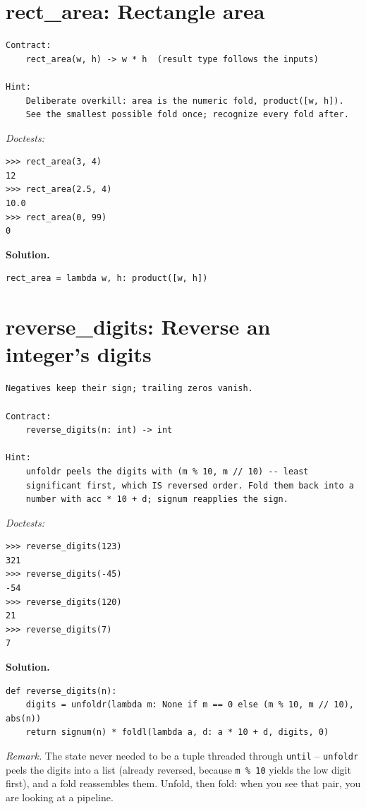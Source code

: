 \documentclass[11pt,letterpaper]{book}
\begin{document}
\section{rect\_area: Rectangle area}
\begin{lstlisting}[style=spec]
Contract:
    rect_area(w, h) -> w * h  (result type follows the inputs)

Hint:
    Deliberate overkill: area is the numeric fold, product([w, h]).
    See the smallest possible fold once; recognize every fold after.
\end{lstlisting}
\noindent\textit{Doctests:}
\begin{lstlisting}[style=spec]
>>> rect_area(3, 4)
12
>>> rect_area(2.5, 4)
10.0
>>> rect_area(0, 99)
0
\end{lstlisting}
\noindent\textbf{Solution.}
\begin{lstlisting}[style=code]
rect_area = lambda w, h: product([w, h])
\end{lstlisting}

\section{reverse\_digits: Reverse an integer's digits}
\begin{lstlisting}[style=spec]
Negatives keep their sign; trailing zeros vanish.

Contract:
    reverse_digits(n: int) -> int

Hint:
    unfoldr peels the digits with (m % 10, m // 10) -- least
    significant first, which IS reversed order. Fold them back into a
    number with acc * 10 + d; signum reapplies the sign.
\end{lstlisting}
\noindent\textit{Doctests:}
\begin{lstlisting}[style=spec]
>>> reverse_digits(123)
321
>>> reverse_digits(-45)
-54
>>> reverse_digits(120)
21
>>> reverse_digits(7)
7
\end{lstlisting}
\noindent\textbf{Solution.}
\begin{lstlisting}[style=code]
def reverse_digits(n):
    digits = unfoldr(lambda m: None if m == 0 else (m % 10, m // 10), abs(n))
    return signum(n) * foldl(lambda a, d: a * 10 + d, digits, 0)
\end{lstlisting}

\noindent\textit{Remark.} The state never needed to be a tuple threaded through
\texttt{until} -- \texttt{unfoldr} peels the digits into a list (already reversed,
because \texttt{m \% 10} yields the low digit first), and a fold reassembles them.
Unfold, then fold: when you see that pair, you are looking at a pipeline.
\end{document}
